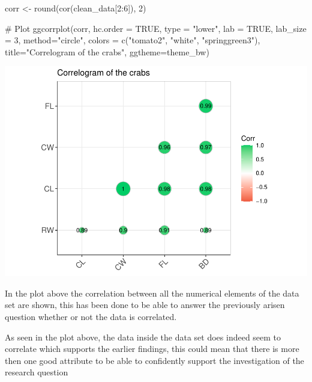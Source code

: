 \documentclass[
]{article}
\newenvironment{Shaded}{}{}
\newcommand{\AttributeTok}[1]{#1}
\newcommand{\CommentTok}[1]{\textcolor[rgb]{0.00,0.50,0.00}{#1}}
\newcommand{\ConstantTok}[1]{#1}
\newcommand{\DecValTok}[1]{#1}
\newcommand{\FunctionTok}[1]{#1}
\newcommand{\NormalTok}[1]{#1}
\newcommand{\OtherTok}[1]{\textcolor[rgb]{1.00,0.25,0.00}{#1}}
\newcommand{\SpecialCharTok}[1]{\textcolor[rgb]{0.00,0.50,0.50}{#1}}
\newcommand{\StringTok}[1]{\textcolor[rgb]{0.00,0.50,0.50}{#1}}
\begin{document}
\begin{Shaded}
\begin{Highlighting}[]
\NormalTok{corr }\OtherTok{\textless{}{-}} \FunctionTok{round}\NormalTok{(}\FunctionTok{cor}\NormalTok{(clean\_data[}\DecValTok{2}\SpecialCharTok{:}\DecValTok{6}\NormalTok{]), }\DecValTok{2}\NormalTok{)}

\CommentTok{\# Plot}
\FunctionTok{ggcorrplot}\NormalTok{(corr, }\AttributeTok{hc.order =} \ConstantTok{TRUE}\NormalTok{, }
           \AttributeTok{type =} \StringTok{"lower"}\NormalTok{, }
           \AttributeTok{lab =} \ConstantTok{TRUE}\NormalTok{, }
           \AttributeTok{lab\_size =} \DecValTok{3}\NormalTok{, }
           \AttributeTok{method=}\StringTok{"circle"}\NormalTok{, }
           \AttributeTok{colors =} \FunctionTok{c}\NormalTok{(}\StringTok{"tomato2"}\NormalTok{, }\StringTok{"white"}\NormalTok{, }\StringTok{"springgreen3"}\NormalTok{), }
           \AttributeTok{title=}\StringTok{"Correlogram of the crabs"}\NormalTok{, }
           \AttributeTok{ggtheme=}\NormalTok{theme\_bw)}
\end{Highlighting}
\end{Shaded}

\begin{center}\includegraphics{Log_files/figure-latex/correlogram-1} \end{center}

In the plot above the correlation between all the numerical elements of
the data set are shown, this has been done to be able to answer the
previously arisen question whether or not the data is correlated.

As seen in the plot above, the data inside the data set does indeed seem
to correlate which supports the earlier findings, this could mean that
there is more then one good attribute to be able to confidently support
the investigation of the research question
\end{document}
